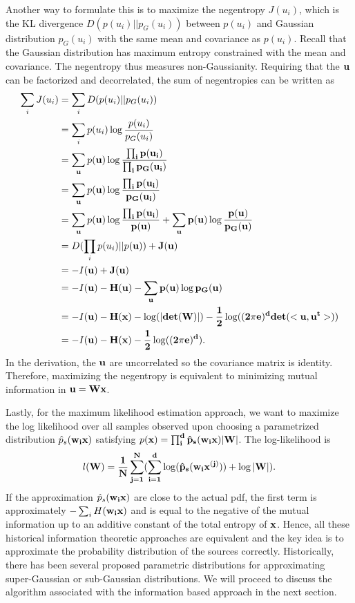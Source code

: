 \documentclass[aps,prl,preprint,superscriptaddress]{revtex4-2}
\begin{document}
Another way to formulate this is to maximize the negentropy $J(u_{i})$, which is the KL divergence $D(p(u_{i})||p_{G}(u_{i}))$ between $p(u_{i})$ and Gaussian distribution $p_{G}(u_{i})$ with the same mean and covariance as $p(u_{i})$. Recall that the Gaussian distribution has maximum entropy constrained with the mean and covariance. The negentropy thus measures non-Gaussianity. Requiring that the $\bf{u}$ can be factorized and decorrelated, the sum of negentropies can be written as 
\begin{align}
\sum_{i}J(u_{i}) &= \sum_{i}D(p(u_{i})||p_{G}(u_{i})) \\
&= \sum_{i}p(u_{i})\log\frac{p(u_{i})}{p_{G}(u_{i})} \\
&= \sum_{\bf{u}}p(\bf{u}) \log\frac{\prod_{i}p(u_{i})}{\prod_{i}p_{G}(u_{i})} \\
&= \sum_{\bf{u}}p(\bf{u}) \log\frac{\prod_{i}p(u_{i})}{p_{G}(\bf{u}_{i})} \\
&= \sum_{\bf{u}}p(\bf{u}) \log\frac{\prod_{i}p(u_{i})}{p(\bf{u})} + \sum_{\bf{u}}p(\bf{u})\log\frac{p(\bf{u})}{p_{G}(\bf{u})} \\
&= D(\prod_{i}p(u_{i})||p(\bf{u})) + J(\bf{u}) \\
&= -I(\bf{u}) + J(\bf{u}) \\
& = -I(\bf{u}) - H(\bf{u}) - \sum_{\bf{u}}p(\bf{u})\log p_{G}(\bf{u}) \\
& = -I(\bf{u}) - H(\bf{x}) - \log(|det(\bf{W})|) - \frac{1}{2}\log((2\pi e)^{d}det(<\bf{u}, \bf{u}^{t}>))\\
&= -I(\bf{u}) - H(\bf{x}) - \frac{1}{2}\log((2\pi e)^{d}).
\end{align} In the derivation, the $\bf{u}$ are uncorrelated so the covariance matrix is identity. Therefore, maximizing the negentropy is equivalent to minimizing mutual information in $\bf{u} = \bf{W}\bf{x}$. 

Lastly, for the maximum likelihood estimation approach, we want to maximize the log likelihood over all samples observed upon choosing a parametrized distribution $\hat{p}_{s}(\bf{w}_{i}\bf{x})$ satisfying $p(\bf{x}) = \prod_{i}^{d}\hat{p}_{s}(\bf{w}_{i}\bf{x})|\bf{W}|$. The log-likelihood is 
\begin{equation}
l(\bf{W}) = \frac{1}{N}\sum_{j=1}^{N}(\sum_{i=1}^{d}\log(\hat{p}_{s}(\bf{w}_{i}\bf{x}^{(j)}))+\log|\bf{W}|).
\end{equation}   
If the approximation $\hat{p}_{s}(\bf{w}_{i}\bf{x})$ are close to the actual pdf, the first term is approximately $-\sum_{i}H(\bf{w}_{i}\bf{x})$ and is equal to the negative of the mutual information up to an additive constant of the total entropy of $\bf{x}$. Hence, all these historical information theoretic approaches are equivalent and the key idea is to approximate the probability distribution of the sources correctly. Historically, there has been several proposed parametric distributions for approximating super-Gaussian or sub-Gaussian distributions. We will proceed to discuss the algorithm associated with the information based approach in the next section. 
\end{document}

